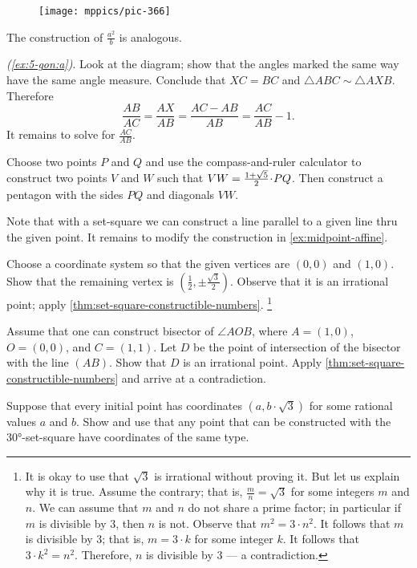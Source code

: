 \begin{multicols}{2}
{\begin{wrapfigure}{r}{27mm}
\vskip-0mm
\centering
\texttt{[image: mppics/pic-366]}
\end{wrapfigure}

The construction of $\tfrac{a^2}b$ is analogous.


\parbf{\ref{ex:5-gon},} \textit{(\ref{ex:5-gon:a})}.
Look at the diagram;
show that the angles marked the same way have the same angle measure.
Conclude that $XC=BC$ and $\triangle ABC\sim \triangle AXB$.
Therefore 
\[\frac{AB}{AC}=\frac{AX}{AB}=\frac{AC-AB}{AB}=\frac{AC}{AB}-1.\]
It remains to solve for $\frac{AC}{AB}$.

}

 Choose two points $P$ and $Q$ and use the compass-and-ruler calculator to construct two points $V$ and $W$ such that $VW\z=\tfrac{1+\sqrt5}2\cdot PQ$.
Then construct a pentagon with the sides $PQ$ and diagonals $VW$.

Note that with a set-square we can construct a line parallel to a given line thru the given point.
It remains to modify the construction in \ref{ex:midpoint-affine}.

Choose a coordinate system so that the given vertices are $(0,0)$ and $(1,0)$.
Show that the remaining vertex is $(\tfrac12,\pm\tfrac{\sqrt{3}}2)$.
Observe that it is an irrational point; apply \ref{thm:set-square-constructible-numbers}.%
\footnote{It is okay to use that $\sqrt{3}$ is irrational without proving it.
But let us explain why it is true. 
Assume the contrary; that is, $\tfrac mn=\sqrt{3}$ for some integers $m$ and $n$.
We can assume that $m$ and $n$ do not share a prime factor; in particular if $m$ is divisible by $3$, then $n$ is not.
Observe that $m^2=3\cdot n^2$.
It follows that $m$ is divisible by 3; that is, $m=3\cdot k$ for some integer $k$.
It follows that $3\cdot k^2=n^2$.
Therefore, $n$ is divisible by 3 --- a contradiction.} 

Assume that one can construct bisector of $\angle AOB$, where $A=(1,0)$, $O=(0,0)$, and $C=(1,1)$.
Let $D$ be the point of intersection of the bisector with the line $(AB)$.
Show that $D$ is an irrational point.
Apply \ref{thm:set-square-constructible-numbers} and arrive at a contradiction.

Suppose that every initial point has coordinates $(a,b\cdot\sqrt{3})$ for some rational values $a$ and $b$.
Show and use that any point that can be constructed with the 30°-set-square have coordinates of the same type.
{

}
\end{multicols}
